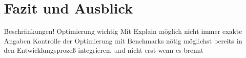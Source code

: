 \section{Fazit und Ausblick}

Beschränkungen!
Optimierung wichtig
Mit Explain möglich
nicht immer exakte Angaben
Kontrolle der Optimierung mit Benchmarks nötig
möglichst bereits in den Entwicklungsprozeß integrieren, und nicht erst wenn es brennt
